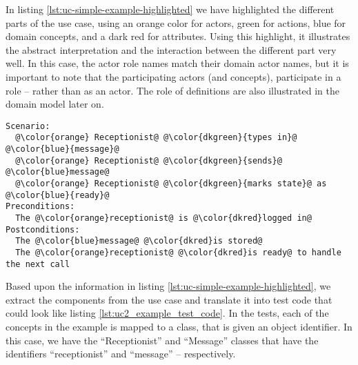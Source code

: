 \noindent In listing \ref{lst:uc-simple-example-highlighted} we have highlighted the different parts of the use case, using an orange color for actors, green for actions, blue for domain concepts, and a dark red for attributes. Using this highlight, it illustrates the abstract interpretation and the interaction between the different part very well. In this case, the actor role names match their domain actor names, but it is important to note that the participating actors (and concepts), participate in a role -- rather than as an actor. The role of definitions are also illustrated in the domain model later on.
\begin{lstlisting}[frame=single,style=usecase, caption=Use case example with its different parts highlighted, label=lst:uc-simple-example-highlighted]
Scenario:
  @\color{orange} Receptionist@ @\color{dkgreen}{types in}@ @\color{blue}{message}@
  @\color{orange} Receptionist@ @\color{dkgreen}{sends}@ @\color{blue}message@
  @\color{orange} Receptionist@ @\color{dkgreen}{marks state}@ as @\color{blue}{ready}@
Preconditions:
  The @\color{orange}receptionist@ is @\color{dkred}logged in@
Postconditions:
  The @\color{blue}message@ @\color{dkred}is stored@
  The @\color{orange}receptionist@ @\color{dkred}is ready@ to handle the next call
\end{lstlisting} 
Based upon the information in listing \ref{lst:uc-simple-example-highlighted}, we extract the components from the use case and translate it into test code that could look like listing \ref{lst:uc2_example_test_code}. In the tests, each of the concepts in the example is mapped to a class, that is given an object identifier. In this case, we have the ``Receptionist'' and ``Message'' classes that have the identifiers ``receptionist'' and ``message'' -- respectively.\medskip

